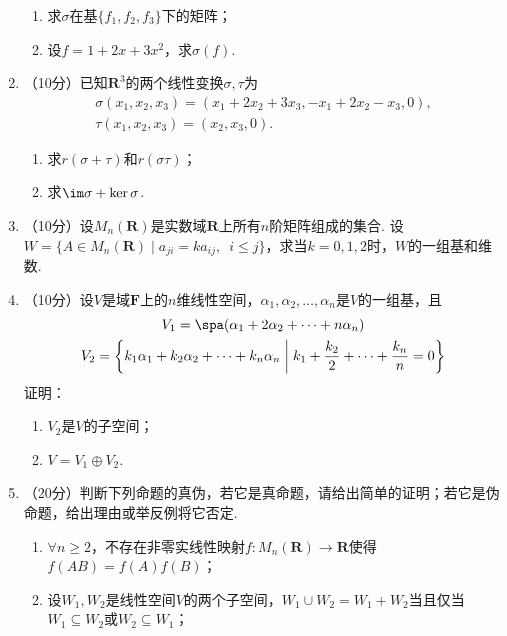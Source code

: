 \begin{enumerate}
\begin{enumerate}
        \item 求$\sigma$在基$\{f_1,f_2,f_3\}$下的矩阵；

        \item 设$f=1+2x+3x^2$，求$\sigma(f)$.
    \end{enumerate}
	\item （10分）已知$\mathbf{R}^3$的两个线性变换$\sigma,\tau$为
    \begin{gather*}
        \sigma(x_1,x_2,x_3)=(x_1+2x_2+3x_3,-x_1+2x_2-x_3,0), \\
        \tau(x_1,x_2,x_3)=(x_2,x_3,0).
    \end{gather*}
    \begin{enumerate}
        \item 求$r(\sigma+\tau)$和$r(\sigma\tau)$；

        \item 求$\im\sigma+\ker\sigma$.
    \end{enumerate}
	\item （10分）设$M_n(\mathbf{R})$是实数域$\mathbf{R}$上所有$n$阶矩阵组成的集合. 设$W=\{A\in M_n(\mathbf{R})\mid a_{ji}=ka_{ij},\enspace i\leqslant j\}$，求当$k=0,1,2$时，$W$的一组基和维数.

    \item （10分）设$V$是域$\mathbf{F}$上的$n$维线性空间，$\alpha_1,\alpha_2,\ldots,\alpha_n$是$V$的一组基，且
    \begin{gather*}
        V_1=\spa(\alpha_1+2\alpha_2+\cdots+n\alpha_n) \\
        V_2=\left\{k_1\alpha_1+k_2\alpha_2+\cdots+k_n\alpha_n \;\middle|\; k_1+\frac{k_2}{2}+\cdots+\frac{k_n}{n}=0\right\}
    \end{gather*}
    证明：
    \begin{enumerate}
        \item $V_2$是$V$的子空间；

        \item $V=V_1\oplus V_2$.
    \end{enumerate}
	\item （20分）判断下列命题的真伪，若它是真命题，请给出简单的证明；若它是伪命题，给出理由或举反例将它否定.
    \begin{enumerate}
        \item $\forall n\geqslant 2$，不存在非零实线性映射$f\colon M_n(\mathbf{R})\to\mathbf{R}$使得$f(AB)=f(A)f(B)$；

        \item 设$W_1,W_2$是线性空间$V$的两个子空间，$W_1\cup W_2=W_1+W_2$当且仅当$W_1\subseteq W_2$或$W_2\subseteq W_1$；


\end{enumerate}
\end{enumerate}
